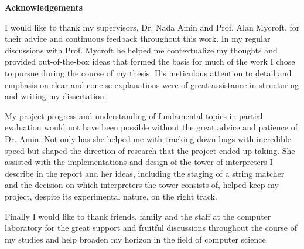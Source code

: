 \newpage
{\Huge \bf Acknowledgements}

\vspace{24pt} 
I would like to thank my supervisors, Dr. Nada Amin and Prof. Alan Mycroft, for their advice and continuous feedback throughout this work. In my regular discussions with Prof. Mycroft he helped me contextualize my thoughts and provided out-of-the-box ideas that formed the basis for much of the work I chose to pursue during the course of my thesis. His meticulous attention to detail and emphasis on clear and concise explanations were of great assistance in structuring and writing my dissertation.

My project progress and understanding of fundamental topics in partial evaluation would not have been possible without the great advice and patience of Dr. Amin. Not only has she helped me with tracking down bugs with incredible speed but shaped the direction of research that the project ended up taking. She assisted with the implementations and design of the tower of interpreters I describe in the report and her ideas, including the staging of a string matcher and the decision on which interpreters the tower consists of, helped keep my project, despite its experimental nature, on the right track.

Finally I would like to thank friends, family and the staff at the computer laboratory for the great support and fruitful discussions throughout the course of my studies and help broaden my horizon in the field of computer science.

\vfill

\newpage
\vspace*{\fill}